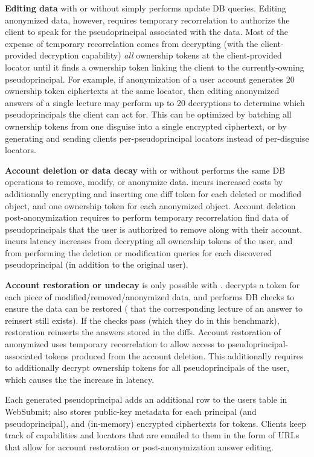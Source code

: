 \textbf{Editing data} with or without \sys simply performs update DB queries. Editing anonymized data,
however, requires temporary recorrelation to authorize the client to speak for the pseudoprincipal
associated with the data.  Most of the expense of temporary recorrelation comes from \sys decrypting
(with the client-provided decryption capability) \emph{all} ownership tokens at the client-provided
locator until it finds a ownership token linking the client to the currently-owning pseudoprincipal.
For example, if anonymization of a user account generates 20 ownership token ciphertexts at the same
locator, then editing anonymized answers of a single lecture may perform up to 20 decryptions to
determine which pseudoprincipals the client can act for. This can be optimized by batching all
ownership tokens from one disguise into a single encrypted ciphertext, or by generating and sending
clients per-pseudoprincipal locators instead of per-disguise locators.

\textbf{Account deletion or data decay} with or without \sys performs the same DB operations to
remove, modify, or anonymize data.  \sys incurs increased costs by additionally encrypting and
inserting one diff token for each deleted or modified object, and one ownership token for each
anonymized object.  Account deletion post-anonymization requires \sys to perform temporary
recorrelation find data of pseudoprincipals that the user is authorized to remove along with their
account.  \sys incurs latency increases from decrypting all ownership tokens of the user, and from
performing the deletion or modification queries for each discovered pseudoprincipal (in addition to
the original user).

\textbf{Account restoration or undecay} is only possible with \sys. \sys decrypts a token for each piece
of modified/removed/anonymized data, and performs DB checks to ensure the data can be restored (\eg
that the corresponding lecture of an answer to reinsert still exists). If the checks pass (which
they do in this benchmark), restoration reinserts the answers stored in the diffs.  Account
restoration of anonymized uses temporary recorrelation to allow \sys access to
pseudoprincipal-associated tokens produced from the account deletion.  This additionally requires
\sys to additionally decrypt ownership tokens for all pseudoprincipals of the user, which causes the 
the increase in latency.

Each generated pseudoprincipal adds an additional row to the users table in WebSubmit; \sys also
stores public-key metadata for each principal (and pseudoprincipal), and (in-memory) encrypted
ciphertexts for tokens.  Clients keep track of capabilities and locators that are emailed to them in
the form of URLs that allow for account restoration or post-anonymization answer editing.

